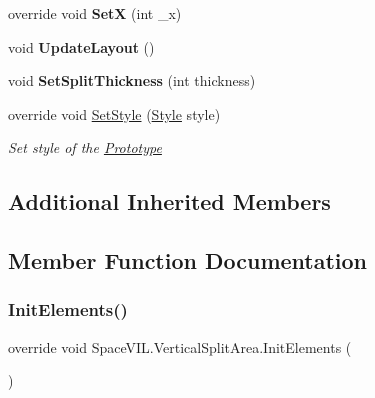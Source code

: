 \begin{DoxyCompactItemize}
\mbox{\label{class_space_v_i_l_1_1_vertical_split_area_a6598a90a036bc0831c0678175d0f4256}} 
override void {\bfseries SetX} (int \+\_\+x)
\item 
\mbox{\label{class_space_v_i_l_1_1_vertical_split_area_a5d58eeccf50eedca1ff09add7eed51c9}} 
void {\bfseries Update\+Layout} ()
\item 
\mbox{\label{class_space_v_i_l_1_1_vertical_split_area_a4329afee056a1f162c92bff8fa7e1e8f}} 
void {\bfseries Set\+Split\+Thickness} (int thickness)
\item 
override void \mbox{\hyperlink{class_space_v_i_l_1_1_vertical_split_area_a5911fe0a1fb51f9e14a4f3f31dac4ecd}{Set\+Style}} (\mbox{\hyperlink{class_space_v_i_l_1_1_decorations_1_1_style}{Style}} style)
\begin{DoxyCompactList}\small\item\em Set style of the \mbox{\hyperlink{class_space_v_i_l_1_1_prototype}{Prototype}} \end{DoxyCompactList}\end{DoxyCompactItemize}
\subsection*{Additional Inherited Members}


\subsection{Member Function Documentation}
\mbox{\label{class_space_v_i_l_1_1_vertical_split_area_ac00bf6f3d89b83dadcdd05f6e95b97d8}} 
\subsubsection{\texorpdfstring{Init\+Elements()}{InitElements()}}
{\footnotesize\ttfamily override void Space\+V\+I\+L.\+Vertical\+Split\+Area.\+Init\+Elements (\begin{DoxyParamCaption}{ }\end{DoxyParamCaption})\hspace{0.3cm}{\ttfamily [virtual]}}



